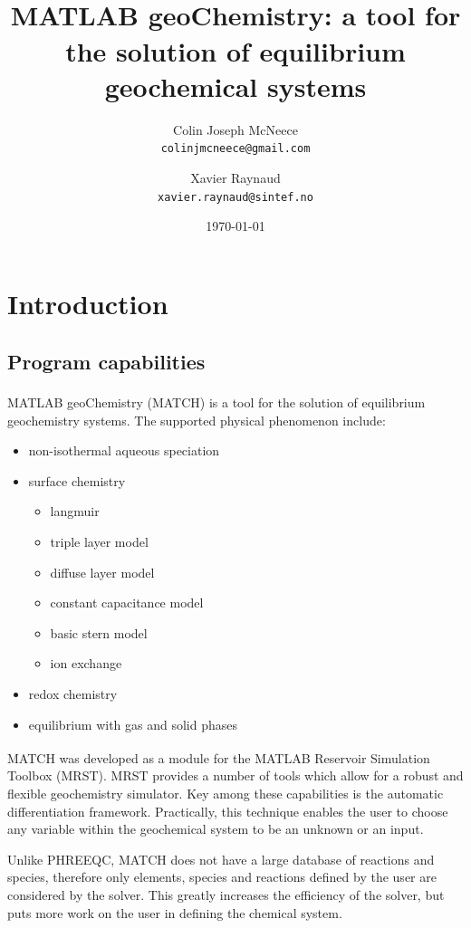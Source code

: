 \documentclass{article}
\title{MATLAB\textsuperscript{\textregistered} geoChemistry: a tool for the solution of equilibrium geochemical systems}
\author{
  Colin Joseph McNeece\\
  \texttt{colinjmcneece@gmail.com}
  \and
  Xavier Raynaud\\
  \texttt{xavier.raynaud@sintef.no}
}
\date{\today}
\begin{document}
\maketitle
\tableofcontents
\section{Introduction}

\subsection{Program capabilities}
MATLAB\textsuperscript{\textregistered} geoChemistry (MATCH) is a tool for the solution of equilibrium geochemistry systems. The supported physical phenomenon include:

\begin{itemize}
    \item non-isothermal aqueous speciation
    \item surface chemistry
    \begin{itemize}
        \item langmuir
        \item triple layer model
        \item diffuse layer model
        \item constant capacitance model
        \item basic stern model
        \item ion exchange
    \end{itemize}
    \item redox chemistry
    \item equilibrium with gas and solid phases
\end{itemize}

MATCH was developed as a module for the MATLAB\textsuperscript{\textregistered} Reservoir Simulation Toolbox (MRST). MRST provides a number of tools which allow for a robust and flexible geochemistry simulator. Key among these capabilities is the automatic differentiation framework. Practically, this technique enables the user to choose any variable within the geochemical system to be an unknown or an input. 

Unlike PHREEQC, MATCH does not have a large database of reactions and species, therefore only elements, species and reactions defined by the user are considered by the solver. This greatly increases the efficiency of the solver, but puts more work on the user in defining the chemical system. 
\end{document}
